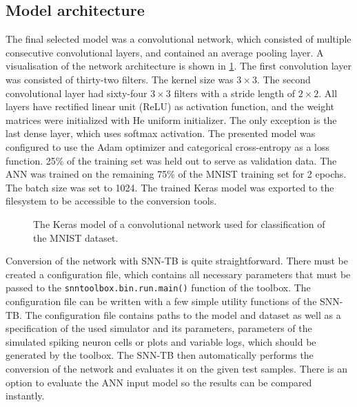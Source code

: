 \subsection{Model architecture}
The final selected model was a convolutional network, which consisted of multiple consecutive convolutional layers, and contained an average pooling layer. A visualisation of the network architecture is shown in \cref{fig:keras_model}. The first convolution layer was consisted of thirty-two filters. The kernel size was $3 \times 3$. The second convolutional layer had sixty-four $3 \times 3$ filters with a stride length of $2 \times 2$. All layers have rectified linear unit (ReLU) as activation function, and the weight matrices were initialized with He uniform initializer. The only exception is the last dense layer, which uses softmax activation. The presented model was configured to use the Adam \cite{kingmaAdamMethod17} optimizer and categorical cross-entropy as a loss function. 25\% of the training set was held out to serve as validation data. The ANN was trained on the remaining 75\% of the MNIST training set for 2 epochs. The batch size was set to 1024. The trained Keras model was exported to the filesystem to be accessible to the conversion tools. \par
\begin{figure}[htbp]
    \centering
    
    \caption{The Keras model of a convolutional network used for classification of the MNIST dataset.}
    \label{fig:keras_model}
\end{figure}
Conversion of the network with SNN-TB is quite straightforward. There must be created a configuration file, which contains all necessary parameters that must be passed to the \texttt{snntoolbox.bin.run.main()} function of the toolbox. The configuration file can be written with a few simple utility functions of the SNN-TB. The configuration file contains paths to the model and dataset as well as a specification of the used simulator and its parameters, parameters of the simulated spiking neuron cells or plots and variable logs, which should be generated by the toolbox. The SNN-TB then automatically performs the conversion of the network and evaluates it on the given test samples. There is an option to evaluate the ANN input model so the results can be compared instantly. \par
